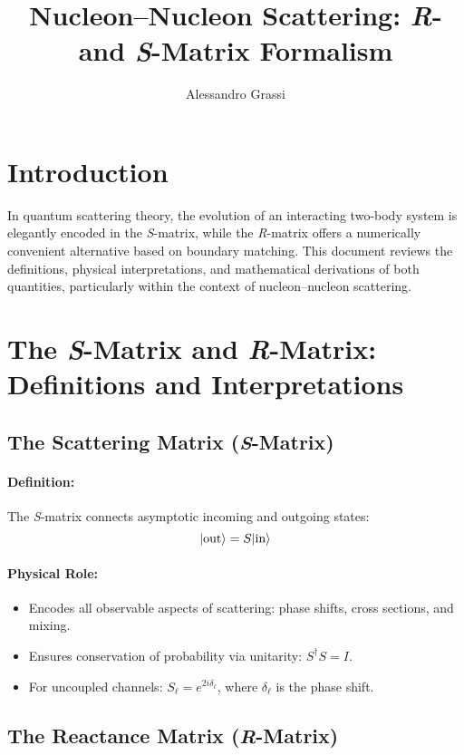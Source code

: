 \documentclass[10pt,a4paper]{article}
\author{Alessandro Grassi}
\title{Nucleon--Nucleon Scattering: \textit{R}- and \textit{S}-Matrix Formalism}
\DeclarePairedDelimiter\Ket{\lvert}{\rangle}
\begin{document}
	\maketitle
	
	\tableofcontents
	
	\section{Introduction}
	
	In quantum scattering theory, the evolution of an interacting two-body system is elegantly encoded in the \textit{S}-matrix, while the \textit{R}-matrix offers a numerically convenient alternative based on boundary matching. This document reviews the definitions, physical interpretations, and mathematical derivations of both quantities, particularly within the context of nucleon--nucleon scattering.
	
	\section{The \textit{S}-Matrix and \textit{R}-Matrix: Definitions and Interpretations}
	
	\subsection{The Scattering Matrix (\textit{S}-Matrix)}
	
	\paragraph{Definition:}
	The \textit{S}-matrix connects asymptotic incoming and outgoing states:
	\[
	\Ket{\text{out}} = S \Ket{\text{in}}
	\]
	
	\paragraph{Physical Role:}
	\begin{itemize}
		\item Encodes all observable aspects of scattering: phase shifts, cross sections, and mixing.
		\item Ensures conservation of probability via unitarity: \( S^\dagger S = I \).
		\item For uncoupled channels: \( S_\ell = e^{2i\delta_\ell} \), where \( \delta_\ell \) is the phase shift.
	\end{itemize}
	
	\subsection{The Reactance Matrix (\textit{R}-Matrix)}
	
\end{document}
